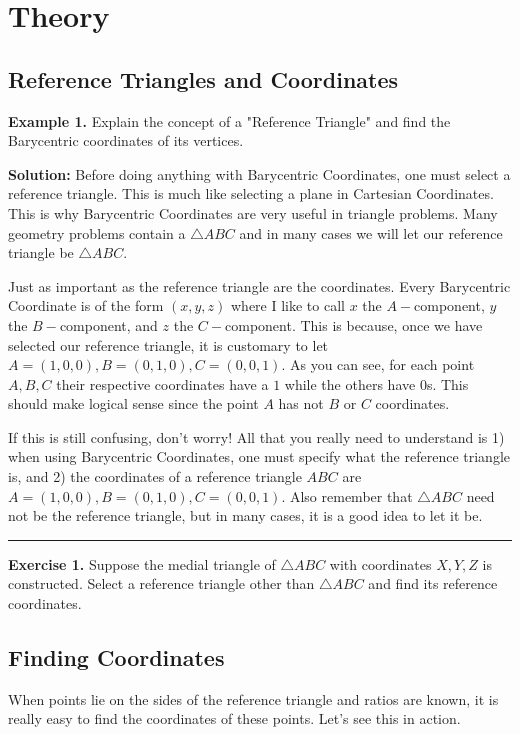 \documentclass{article}
\begin{document}
\section{Theory}
\subsection{Reference Triangles and Coordinates}
\textbf{Example 1.} Explain the concept of a "Reference Triangle" and find the Barycentric coordinates of its vertices.
\vspace{.1in}

\textbf{Solution:} Before doing anything with Barycentric Coordinates, one must select a reference triangle. This is much like selecting a plane in Cartesian Coordinates. This is why Barycentric Coordinates are very useful in triangle problems. Many geometry problems contain a $\triangle ABC$ and in many cases we will let our reference triangle be $\triangle ABC$. 

Just as important as the reference triangle are the coordinates. Every Barycentric Coordinate is of the form $(x,y,z)$ where I like to call $x$ the $A-$component, $y$ the $B-$component, and $z$ the $C-$component. This is because, once we have selected our reference triangle, it is customary to let $A=(1,0,0),B=(0,1,0),C=(0,0,1)$. As you can see, for each point $A,B,C$ their respective coordinates have a $1$ while the others have $0$s. This should make logical sense since the point $A$ has not $B$ or $C$ coordinates. 


If this is still confusing, don't worry! All that you really need to understand is 1) when using Barycentric Coordinates, one must specify what the reference triangle is, and 2) the coordinates of a reference triangle $ABC$ are $A=(1,0,0),B=(0,1,0),C=(0,0,1)$. Also remember that $\triangle ABC$ need not be the reference triangle, but in many cases, it is a good idea to let it be. 
\vspace{.2in}
\hrule
\vspace{.2in}
\textbf{Exercise 1.} Suppose the medial triangle of $\triangle ABC$ with coordinates $X,Y,Z$ is constructed. Select a reference triangle other than $\triangle ABC$ and find its reference coordinates.

\subsection{Finding Coordinates}
When points lie on the sides of the reference triangle and ratios are known, it is really easy to find the coordinates of these points. Let's see this in action.
\vspace{.2in}
\end{document}
